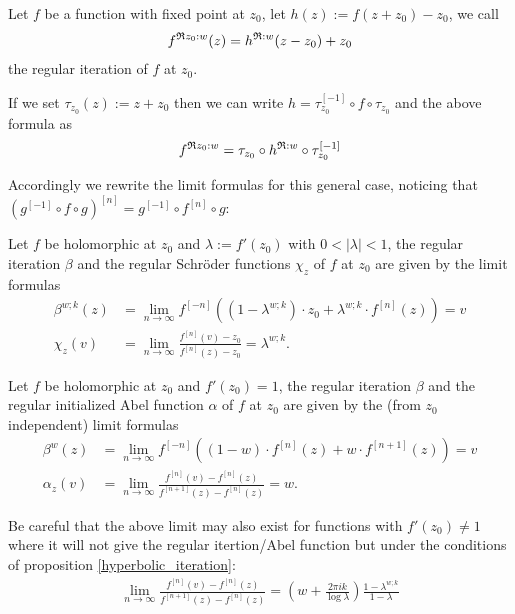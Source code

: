 \documentclass{article}
\numberwithin{equation}{section}
\begin{document}
\begin{definition}
  Let $f$ be a function with fixed point at $z_0$, let
  $h(z):=f(z+z_0)-z_0$,
  we call 
  \begin{align}
    {f}^{\mathfrak{R}z_0:w}(z)={h}^{\mathfrak{R}:w}(z-z_0)+z_0 
  \end{align}
  the regular iteration of $f$ at $z_0$.
\end{definition}
If we set $\tau_{z_0}(z):=z+z_0$ then we can write $h=\tau_{z_0}^{[-1]}\circ f
\circ \tau_{z_0}$ and the above formula as 
\begin{align}
	{f}^{\mathfrak{R}z_0:w}=\tau_{z_0}\circ {h}^{\mathfrak{R}:w}\circ \tau_{z_0}^{[-1]}
\end{align}

Accordingly we rewrite the limit formulas for this general case,
noticing that $(g^{[-1]}\circ f\circ g)^{[n]}=g^{[-1]}\circ f^{[n]}
\circ g$:

\begin{proposition}\label{hyperbolic_iteration}
Let $f$ be holomorphic at $z_0$ and $\lambda:=f'(z_0)$ with
$0<|\lambda|<1$, the regular iteration $\beta$ and the regular
Schröder functions $\chi_z$ of $f$ at $z_0$ are given by the limit
formulas
\begin{align}
  \beta^{w;k}(z)&=\lim_{n\to\infty}
  f^{[-n]}\left((1-\lambda^{w;k})\cdot z_0+\lambda^{w;k}\cdot f^{[n]}(z)\right)=v\\
  \chi_z(v)&=\lim_{n\to\infty}
  \frac{f^{[n]}(v)-z_0}{f^{[n]}(z)-z_0}=\lambda^{w;k}
.\end{align}
\end{proposition}

\begin{proposition}\label{prop:Levy2}
  Let $f$ be holomorphic at $z_0$ and $f'(z_0)=1$, the regular
  iteration $\beta$ and the regular initialized Abel function $\alpha$ of $f$ at
  $z_0$ are given by the (from $z_0$ independent) limit formulas
  \begin{align}
    \beta^w(z)&= \lim_{n\to\infty}f^{[-n]}((1-w)\cdot f^{[n]}(z)+w\cdot f^{[n+1]}(z))=v\\
    \alpha_z(v)&=\lim_{n\to\infty}\frac{f^{[n]}(v) - f^{[n]}(z)}{f^{[n+1]}(z)-f^{[n]}(z)}=w
  .\end{align}
\end{proposition}

Be careful that the above limit may also exist for functions with
$f'(z_0)\neq 1$ where it will not give the regular itertion/Abel
function but under the conditions of proposition \ref{hyperbolic_iteration}:
\begin{align}
  \lim_{n\to\infty}
  \frac{f^{[n]}(v)-f^{[n]}(z)}{f^{[n+1]}(z)-f^{[n]}(z)}=\left(w+\frac{2\pi i
    k}{\log \lambda}\right)\frac{1-\lambda^{w;k}}{1-\lambda}
\end{align}
\end{document}
